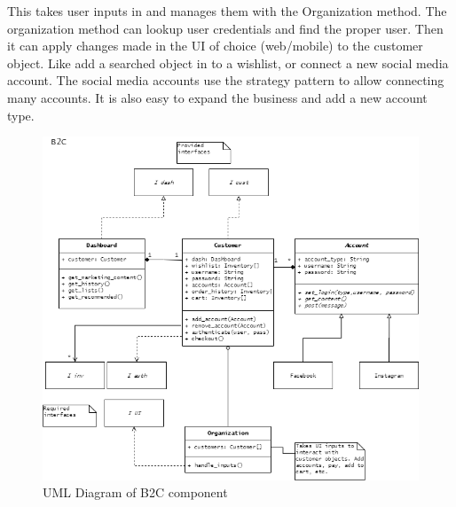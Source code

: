 \documentclass[11pt]{article}
\begin{document}
\newpage
{}

This takes user inputs in and manages them with the Organization method. The organization method can lookup user credentials and find the proper user. Then it can apply changes made in the UI of choice (web/mobile) to the customer object. Like add a searched object in to a wishlist, or connect a new social media account. The social media accounts use the strategy pattern to allow connecting many accounts. It is also easy to expand the business and add a new account type. 

\begin{figure}[H]
    \centering
    \includegraphics[width = \linewidth]{./p3_uml.png}
    \caption{UML Diagram of B2C component}
    \label{fig:uml}
\end{figure}
\end{document}
